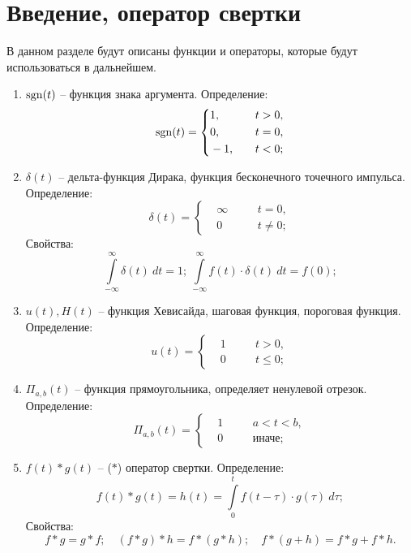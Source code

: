 \section{Введение, оператор свертки}

	В данном разделе будут описаны функции и операторы, которые будут использоваться в дальнейшем.

	\begin{enumerate}

		\item \( \operatorname{sgn}(t) \) -- функция знака аргумента. Определение:
		\[ \operatorname{sgn}(t) = \left\lbrace \begin{split} &1, \quad && t > 0, \\ &0, \quad && t = 0, \\ &-1, \quad && t < 0; \end{split} \right. \]

		\item \( \delta(t) \) -- дельта-функция Дирака, функция бесконечного точечного импульса. Определение:
		\[ \delta(t) = \left\lbrace \begin{split} &\infty \quad &&t = 0, \\ &0 \quad &&t \neq 0; \end{split} \right. \]
		Свойства:
		\[ \int\limits_{-\infty}^{\infty} \delta(t) ~ dt = 1; ~ \int\limits_{-\infty}^{\infty} f(t) \cdot \delta(t) ~ dt = f(0); \]

		\item \( u(t), H(t) \) -- функция Хевисайда, шаговая функция, пороговая функция. Определение:
		\[ u(t) = \left\lbrace \begin{split} &1 \quad && t > 0, \\ &0 \quad && t \le 0; \end{split} \right. \] 

		\item \( \Pi_{a, b}(t) \) -- функция прямоугольника, определяет ненулевой отрезок. Определение:
		\[ \Pi_{a, b}(t) = \left\lbrace \begin{split} &1 \quad && a < t < b, \\ &0 \quad && \text{иначе}; \end{split} \right. \] 

		\item \( f(t) * g(t) \) -- ($*$) оператор свертки. Определение:
		\[ f(t) * g(t) = h(t) = \int\limits_{0}^{t} f(t-\tau) \cdot g(\tau) ~ d \tau; \]
		Свойства:
		\[ f * g = g * f; \quad ( f * g ) * h = f * ( g * h ); \quad f * (g + h) = f * g + f * h. \]

	\end{enumerate}

